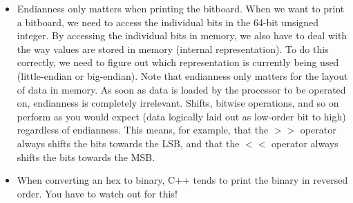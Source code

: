 \begin{itemize}
	\item Endianness only matters when printing the bitboard.
	When we want to print a bitboard, we need to access the individual bits in the 64-bit unsigned integer.
	By accessing the individual bits in memory, we also have to deal with the way values are stored in memory (internal representation).
	To do this correctly, we need to figure out which representation is currently being used (little-endian or big-endian).
	Note that endianness only matters for the layout of data in memory.
	As soon as data is loaded by the processor to be operated on, endianness is completely irrelevant.
	Shifts, bitwise operations, and so on perform as you would expect (data logically laid out as low-order bit to high) regardless of endianness.
	This means, for example, that the $>>$ operator always shifts the bits towards the LSB, and that the $<<$ operator always shifts the bits towards the MSB.
	
	\item When converting an hex to binary, C++ tends to print the binary in reversed order. You have to watch out for this!
\end{itemize}
%
\begin{code}

\end{code}
